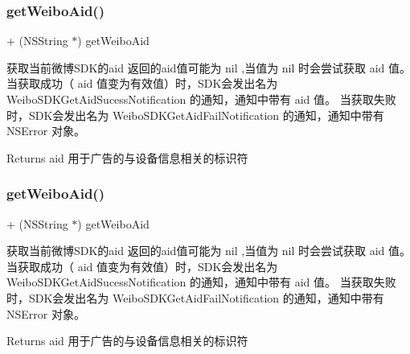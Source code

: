 \subsubsection{\texorpdfstring{get\+Weibo\+Aid()}{getWeiboAid()}\hspace{0.1cm}{\footnotesize\ttfamily [2/3]}}
{\footnotesize\ttfamily + (N\+S\+String $\ast$) get\+Weibo\+Aid \begin{DoxyParamCaption}{ }\end{DoxyParamCaption}}

获取当前微博\+S\+D\+K的aid 返回的aid值可能为 nil ,当值为 nil 时会尝试获取 aid 值。 当获取成功（ aid 值变为有效值）时，\+S\+D\+K会发出名为 Weibo\+S\+D\+K\+Get\+Aid\+Sucess\+Notification 的通知，通知中带有 aid 值。 当获取失败时，\+S\+D\+K会发出名为 Weibo\+S\+D\+K\+Get\+Aid\+Fail\+Notification 的通知，通知中带有 N\+S\+Error 对象。 \begin{DoxyReturn}{Returns}
aid 用于广告的与设备信息相关的标识符 
\end{DoxyReturn}
\mbox{\label{interface_weibo_s_d_k_aec605d5ae27958199c450a8eda005298}} 
\subsubsection{\texorpdfstring{get\+Weibo\+Aid()}{getWeiboAid()}\hspace{0.1cm}{\footnotesize\ttfamily [3/3]}}
{\footnotesize\ttfamily + (N\+S\+String $\ast$) get\+Weibo\+Aid \begin{DoxyParamCaption}{ }\end{DoxyParamCaption}}

获取当前微博\+S\+D\+K的aid 返回的aid值可能为 nil ,当值为 nil 时会尝试获取 aid 值。 当获取成功（ aid 值变为有效值）时，\+S\+D\+K会发出名为 Weibo\+S\+D\+K\+Get\+Aid\+Sucess\+Notification 的通知，通知中带有 aid 值。 当获取失败时，\+S\+D\+K会发出名为 Weibo\+S\+D\+K\+Get\+Aid\+Fail\+Notification 的通知，通知中带有 N\+S\+Error 对象。 \begin{DoxyReturn}{Returns}
aid 用于广告的与设备信息相关的标识符 
\end{DoxyReturn}
\mbox{\label{interface_weibo_s_d_k_a49504103f9378dcde673b4c6b52b71e3}} 
